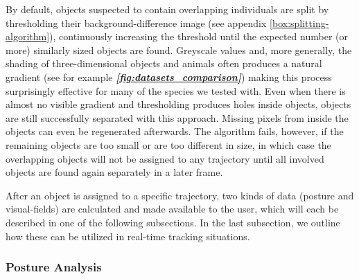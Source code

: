 \documentclass[9pt,lineno]{elife}
\newcommand{\figref}[1]{\textit{\textbf{\ref{#1}}}}
\begin{document}
By default, objects suspected to contain overlapping individuals are split by thresholding their background-difference image (see appendix \autoref{box:splitting-algorithm}), continuously increasing the threshold until the expected number (or more) similarly sized objects are found. Greyscale values and, more generally, the shading of three-dimensional objects and animals often produces a natural gradient (see for example \figref{fig:datasets_comparison}) making this process surprisingly effective for many of the species we tested with. Even when there is almost no visible gradient and thresholding produces holes inside objects, objects are still successfully separated with this approach. Missing pixels from inside the objects can even be regenerated afterwards. The algorithm fails, however, if the remaining objects are too small or are too different in size, in which case the overlapping objects will not be assigned to any trajectory until all involved objects are found again separately in a later frame.

After an object is assigned to a specific trajectory, two kinds of data (posture and visual-fields) are calculated and made available to the user, which will each be described in one of the following subsections. In the last subsection, we outline how these can be utilized in real-time tracking situations.

\subsubsection{Posture Analysis}
\end{document}
